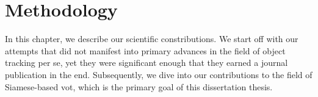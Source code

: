 \chapter{Methodology}
\label{chap:Methodology}

In this chapter, we describe our scientific constributions. We start off with our attempts that did not manifest into primary advances in the field of object tracking per se, yet they were significant enough that they earned a journal publication in the end. Subsequently, we dive into our contributions to the field of Siamese-based \gls{vot}, which is the primary goal of this dissertation thesis.



